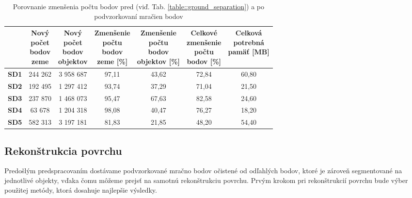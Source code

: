 \begin{table}
    \begin{center} %
        \begin{tabular}{|c || c | c | c | c | c| c|} 
         \hline
          & \thead{Nový \\ počet \\ bodov \\ zeme} &
            \thead{Nový \\ počet \\ bodov \\ objektov} &
            \thead{Zmenšenie \\ počtu \\ bodov \\ zeme [\%]} &
            \thead{Zmenšenie \\ počtu \\ bodov \\ objektov [\%]} &
            \thead{Celkové \\ zmenšenie \\ počtu \\ bodov [\%]} & 
            \thead{Celková \\ potrebná \\ pamäť [MB]} \\ [0.5ex]    
         \hline\hline
         \textbf{SD1} & 244 262  & 3 958 687 & 97,11 & 43,62 & 72,84 & 60,80  \\ 
         \hline
         \textbf{SD2} & 192 495  & 1 297 412 & 93,74 & 37,29 & 71,04 & 21,50 \\
         \hline
         \textbf{SD3} &  237 870  & 1 468 073 & 95,47 & 67,63 & 82,58 & 24,60 \\
         \hline
         \textbf{SD4} & 63 678  & 1 204 318 & 98,08 & 40,47 & 76,27 & 18,20 \\
         \hline
         \textbf{SD5} & 582 313  & 3 197 181 & 81,83 & 21,85 & 48,20 & 54,40 \\ 
         \hline
        \end{tabular}
    \caption{Porovnanie zmenšenia počtu bodov pred (viď. Tab. \ref{table::ground_separation}) a po podvzorkovaní mračien bodov}
    \label{table:subsampling}
    \end{center}
\end{table}

\subsection{Rekonštrukcia povrchu}
\noindent Predošlým predspracovaním dostávame podvzorkované mračno bodov očistené od odľahlých bodov, ktoré je zároveň segmentované na jednotlivé objekty, vďaka čomu môžeme prejsť na samotnú rekonštrukciu povrchu. Prvým krokom pri rekonštrukcií povrchu bude výber použitej metódy, ktorá dosahuje najlepšie výsledky.  

